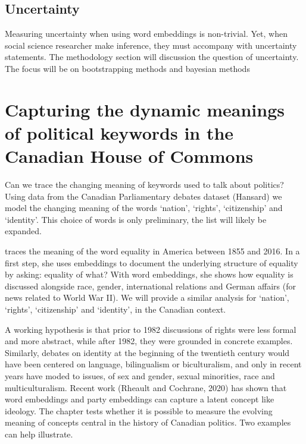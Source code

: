 \documentclass[
  openany]{book}
\begin{document}
\hypertarget{uncertainty}{%
\section{Uncertainty}\label{uncertainty}}

Measuring uncertainty when using word embeddings is non-trivial. Yet, when social science researcher make inference, they must accompany with uncertainty statements. The methodology section will discussion the question of uncertainty. The focus will be on bootstrapping methods \citep{rodman2020timely} and bayesian methods \citep{han2018conditional, lauretig2019identification}

\hypertarget{capturing-the-dynamic-meanings-of-political-keywords-in-the-canadian-house-of-commons}{%
\chapter{Capturing the dynamic meanings of political keywords in the Canadian House of Commons}\label{capturing-the-dynamic-meanings-of-political-keywords-in-the-canadian-house-of-commons}}

Can we trace the changing meaning of keywords used to talk about politics? Using data from the Canadian Parliamentary debates dataset (Hansard) we model the changing meaning of the words `nation', `rights', `citizenship' and `identity'. This choice of words is only preliminary, the list will likely be expanded.

\citet{rodman2020timely} traces the meaning of the word equality in America between 1855 and 2016. In a first step, she uses embeddings to document the underlying structure of equality by asking: equality of what? With word embeddings, she shows how equality is discussed alongside race, gender, international relations and German affairs (for news related to World War II). We will provide a similar analysis for `nation', `rights', `citizenship' and `identity', in the Canadian context.

A working hypothesis is that prior to 1982 discussions of rights were less formal and more abstract, while after 1982, they were grounded in concrete examples. Similarly, debates on identity at the beginning of the twentieth century would have been centered on language, bilingualism or biculturalism, and only in recent years have moded to issues, of sex and gender, sexual minorities, race and multiculturalism. Recent work (Rheault and Cochrane, 2020) has shown that word embeddings and party embeddings can capture a latent concept like ideology. The chapter tests whether it is possible to measure the evolving meaning of concepts central in the history of Canadian politics. Two examples can help illustrate.
\end{document}
